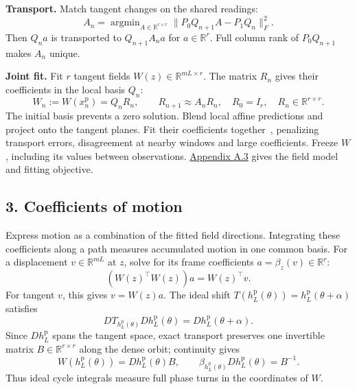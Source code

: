 \documentclass[11pt,a4paper]{article}
\newcommand{\R}{\mathbb R}
\begin{document}
\textbf{Transport.} Match tangent changes on the shared readings:
\[
A_n=\mathop{\arg\min}_{A\in\R^{r\times r}}
\|P_0Q_{n+1}A-P_1Q_n\|_F^2.
\]
Then $Q_na$ is transported to $Q_{n+1}A_na$ for $a\in\R^r$.
Full column rank of $P_0Q_{n+1}$ makes $A_n$ unique.

\textbf{Joint fit.} Fit $r$ tangent fields $W(z)\in\R^{mL\times r}$.
The matrix $R_n$ gives their coefficients in the local basis $Q_n$:
\[
W_n:=W(x_n^{\mathrm p})=Q_nR_n,\qquad
R_{n+1}\approx A_nR_n,\quad R_0=I_r,\quad R_n\in\R^{r\times r}.
\]
The initial basis prevents a zero solution.
Blend local affine predictions and project onto the tangent planes.
Fit their coefficients together~\citep{Thunberg2015}, penalizing transport
errors, disagreement at nearby windows and large coefficients.
Freeze $W$, including its values between observations.
\hyperref[app:field-model]{Appendix A.3} gives the field model and fitting objective.

\subsection*{3. Coefficients of motion}
Express motion as a combination of the fitted field directions.
Integrating these coefficients along a path measures accumulated motion
in one common basis.
For a displacement $v\in\R^{mL}$ at $z$, solve for its frame coefficients
$a=\beta_z(v)\in\R^r$:
\[
(W(z)^\top W(z))a=W(z)^\top v.
\]
For tangent $v$, this gives $v=W(z)a$.
The ideal shift
$T(h_L^{\mathrm p}(\theta))=h_L^{\mathrm p}(\theta+\alpha)$ satisfies
\[
DT_{h_L^{\mathrm p}(\theta)}Dh_L^{\mathrm p}(\theta)
=Dh_L^{\mathrm p}(\theta+\alpha).
\]
Since $Dh_L^{\mathrm p}$ spans the tangent space, exact transport preserves
one invertible matrix $B\in\R^{r\times r}$ along the dense orbit;
continuity gives
\[
W(h_L^{\mathrm p}(\theta))=Dh_L^{\mathrm p}(\theta)B,
\qquad \beta_{h_L^{\mathrm p}(\theta)}Dh_L^{\mathrm p}(\theta)=B^{-1}.
\]
Thus ideal cycle integrals measure full phase turns in the coordinates of $W$.
\end{document}
